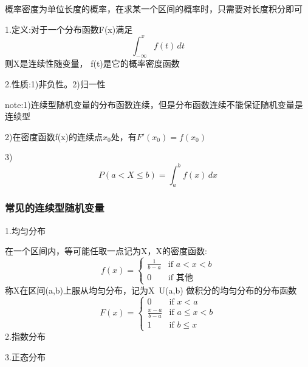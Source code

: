 \documentclass[11pt,twoside,a4paper]{ctexart}
\begin{document}
    概率密度为单位长度的概率，在求某一个区间的概率时，只需要对长度积分即可
    
    1.定义:对于一个分布函数F(x)满足
    \[\int_{-\infty}^{x}f(t)  \,dt  \]
    则X是连续性随变量， f(t)是它的概率密度函数

    2.性质:1)非负性。2)归一性

    note:1)连续型随机变量的分布函数连续，但是分布函数连续不能保证随机变量是连续型

    2)在密度函数f(x)的连续点$x_0$处，有$F'(x_0) = f(x_0)$

    3)
    \[P(a < X \leq b) = \int_{a}^{b}f(x) \,dx\]
    \subsubsection{常见的连续型随机变量}
    1.均匀分布

    在一个区间内，等可能任取一点记为X，X的密度函数:
    \[f(x) = 
    \begin{cases}
        \frac{1}{b - a} & \text{if } a<x<b \\
        0 & \text{if } \text{其他}
    \end{cases} \]
    称X在区间(a,b)上服从均匀分布，记为X~U(a,b)
    做积分的均匀分布的分布函数
    \[F(x) = 
    \begin{cases}
        0 & \text{if } x<a \\
        \frac{x-a}{b-a} & \text{if } a\leq x<b \\
        1 & \text{if } b\leq x
    \end{cases}\]
    2.指数分布

    3.正态分布
\end{document}
